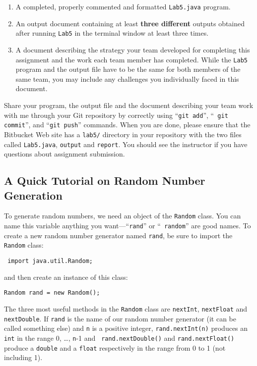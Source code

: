 \begin{enumerate}
	\item A completed, properly commented and formatted {\tt Lab5.java} program.

        \item An output document containing at least \textbf{three different} outputs obtained after running {\tt Lab5} in the terminal window at least three times.

        \item A document describing the strategy your team developed for completing this assignment and the work each team member has completed. While the {\tt Lab5} program and the output file have to be the same for both members of the same team, you may include any challenges you individually faced in this document.
\end{enumerate}

\vspace{-0.1in}
Share your program, the output file and the document describing your team work with me through your Git repository by correctly using ``{\tt git add}'', ``{\tt
git commit}'', and ``{\tt git push}'' commands. When you are done, please ensure that the Bitbucket Web site has
a {\tt lab5/} directory in your repository with the two files called {\tt Lab5.java}, {\tt output} and {\tt report}. You should see
the instructor if you have questions about assignment submission.

\vspace{-0.05in}
\subsection*{A Quick Tutorial on Random Number Generation}
\vspace{-0.05in}
To generate random numbers, we need an object of the {\tt Random} class.
You can name this variable anything you want---``{\tt rand}'' or ``{\tt
random}'' are good names. To create a new random number generator
named {\tt rand}, be sure to import the {\tt Random} class:
\begin{center}
\verb$ import java.util.Random;$
\end{center}
and then create an instance of this class:
\begin{center}
\verb$Random rand = new Random();$
\end{center}

The three most useful methods in the {\tt Random} class are {\tt nextInt}, {\tt nextFloat} and {\tt nextDouble}. If {\tt rand} is the name of our random number
generator (it can be called something else) and {\tt n} is a positive integer, {\tt rand.nextInt(n)}
produces an {\tt int} in the range 0, \ldots, {\tt n}-1 and {\tt
rand.nextDouble()} and {\tt rand.nextFloat()} produce a {\tt double} and a {\tt float} respectively in the range from 0 to 1 (not
including 1).

